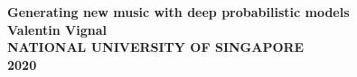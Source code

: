 \documentclass[12pt]{report}
\begin{document}


\pagestyle{empty}
\setlength{\parindent}{0cm}
\begin{center}
    {\textbf{\Large Generating new music with deep probabilistic models}}\\
    \vspace{7cm}
    {\textbf{\Large Valentin Vignal}}\\
    \vspace{7cm}
   {\textbf{\Large NATIONAL UNIVERSITY OF SINGAPORE\\}}
    \vspace{1cm}
    {\textbf{\Large 2020}}\\
\end{center}
\newpage



\end{document}
